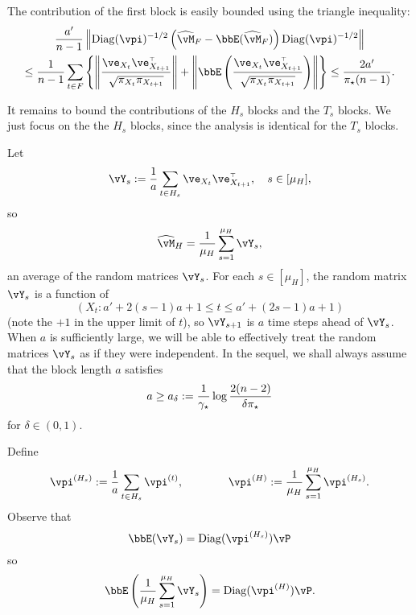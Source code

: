 The contribution of the first block is easily bounded using the
triangle inequality:
\begin{multline}
  \frac{a'}{n-1}
  \Norm{
    \Diag(\vpi)^{-1/2}
    \Parens{
      \wh\vM_F - \bbE(\wh\vM_F)
    }
    \Diag(\vpi)^{-1/2}
  }
  \\
  \leq
  \frac1{n-1} \sum_{t \in F}
  \Braces{
    \Norm{
      \frac{
        \ve_{X_t} \ve_{X_{t+1}}^\t
      }{\sqrt{\pi_{X_t}\pi_{X_{t+1}}}}
    }
    +
    \Norm{
      \bbE\Parens{
        \frac{
          \ve_{X_t} \ve_{X_{t+1}}^\t
        }{\sqrt{\pi_{X_t}\pi_{X_{t+1}}}}
      }
    }
  }
  \leq
  \frac{2a'}{\pimin(n-1)}
  .
  \label{eq:first-block}
\end{multline}

It remains to bound the contributions of the $H_s$ blocks and the
$T_s$ blocks.
We just focus on the the $H_s$ blocks, since the analysis is identical
for the $T_s$ blocks.

Let
\[
  \vY_s := \frac1a \sum_{t \in H_s} \ve_{X_t} \ve_{X_{t+1}}^\t ,
  \quad s \in [\mu_H] ,
\]
so
\[
  \wh{\vM}_H = \frac1{\mu_H} \sum_{s=1}^{\mu_H} \vY_s ,
\]
an average of the random matrices $\vY_s$.
For each $s \in [\mu_H]$, the random matrix $\vY_s$ is a function of
\[ (X_t : a' + 2(s-1)a + 1 \leq t \leq a' + (2s-1)a + 1) \]
(note the $+1$ in the upper limit of $t$),
so $\vY_{s+1}$ is $a$ time steps ahead of $\vY_s$.
When $a$ is sufficiently large, we will be able to effectively treat
the random matrices $\vY_s$ as if they were independent.
In the sequel, we shall always assume that the block length $a$
satisfies
\begin{equation}
  \label{eq:block-length}
  a \geq
  a_\delta
  :=
  \frac{1}{\gamma_{\star}} \log \frac{2(n-2)}{\delta\pi_{\star}}
\end{equation}
for $\delta \in (0,1)$.

Define%
\begin{align*}
  \vpi^{(H_s)}  := \frac1a \sum_{t \in H_s} \vpi^{(t)} , \qquad \qquad
  \vpi^{(H)}  := \frac1{\mu_H} \sum_{s=1}^{\mu_H} \vpi^{(H_s)} .
\end{align*}
Observe that
\[
  \bbE(\vY_s)
  = \Diag(\vpi^{(H_s)}) \vP
\]
so
\[
  \bbE\Parens{
    \frac1{\mu_H} \sum_{s=1}^{\mu_H} \vY_s
  } = \Diag(\vpi^{(H)}) \vP
  .
\]

